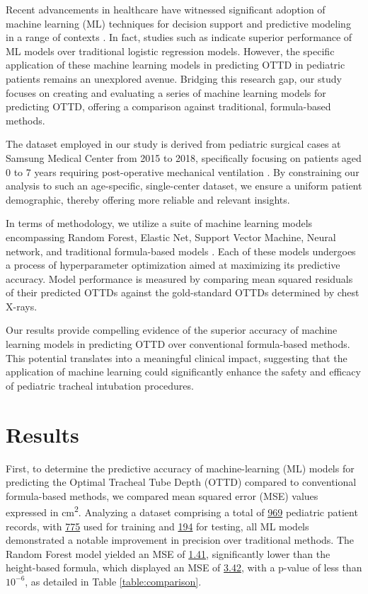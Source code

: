 \documentclass[11pt]{article}
\begin{document}
Recent advancements in healthcare have witnessed significant adoption of machine learning (ML) techniques for decision support and predictive modeling in a range of contexts \cite{Johnson2016MachineLA}. In fact, studies such as \cite{Bao2019MachineLF, Meyer2018MachineLF} indicate superior performance of ML models over traditional logistic regression models. However, the specific application of these machine learning models in predicting OTTD in pediatric patients remains an unexplored avenue. Bridging this research gap, our study focuses on creating and evaluating a series of machine learning models for predicting OTTD, offering a comparison against traditional, formula-based methods.

The dataset employed in our study is derived from pediatric surgical cases at Samsung Medical Center from 2015 to 2018, specifically focusing on patients aged 0 to 7 years requiring post-operative mechanical ventilation \cite{Sheikhalishahi2019BenchmarkingML, Ingelse2017EarlyFO, Gupta2015RelationshipOE}. By constraining our analysis to such an age-specific, single-center dataset, we ensure a uniform patient demographic, thereby offering more reliable and relevant insights.

In terms of methodology, we utilize a suite of machine learning models encompassing Random Forest, Elastic Net, Support Vector Machine, Neural network, and traditional formula-based models \cite{Alanazi2017ACR, Shillan2019UseOM}. Each of these models undergoes a process of hyperparameter optimization aimed at maximizing its predictive accuracy. Model performance is measured by comparing mean squared residuals of their predicted OTTDs against the gold-standard OTTDs determined by chest X-rays.

Our results provide compelling evidence of the superior accuracy of machine learning models in predicting OTTD over conventional formula-based methods. This potential translates into a meaningful clinical impact, suggesting that the application of machine learning could significantly enhance the safety and efficacy of pediatric tracheal intubation procedures.

\section*{Results}

First, to determine the predictive accuracy of machine-learning (ML) models for predicting the Optimal Tracheal Tube Depth (OTTD) compared to conventional formula-based methods, we compared mean squared error (MSE) values expressed in cm\textsuperscript{2}. Analyzing a dataset comprising a total of \hyperlink{R0a}{969} pediatric patient records, with \hyperlink{R1a}{775} used for training and \hyperlink{R2a}{194} for testing, all ML models demonstrated a notable improvement in precision over traditional methods. The Random Forest model yielded an MSE of \hyperlink{A0a}{1.41}, significantly lower than the height-based formula, which displayed an MSE of \hyperlink{A0b}{3.42}, with a p-value of less than \hyperlink{A0c}{$10^{-6}$}, as detailed in Table \ref{table:comparison}.
\end{document}
